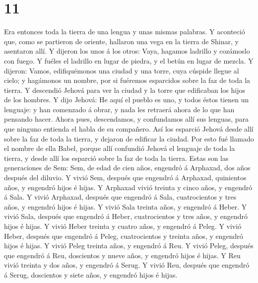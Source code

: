 \hypertarget{section-10}{%
\section{11}\label{section-10}}

 Era entonces toda la tierra de una lengua y unas mismas
palabras.  Y aconteció que, como se partieron de oriente,
hallaron una vega en la tierra de Shinar, y asentaron allí. 
Y dijeron los unos á los otros: Vaya, hagamos ladrillo y cozámoslo con
fuego. Y fuéles el ladrillo en lugar de piedra, y el betún en lugar de
mezcla.  Y dijeron: Vamos, edifiquémonos una ciudad y una
torre, cuya cúspide llegue al cielo; y hagámonos un nombre, por si
fuéremos esparcidos sobre la faz de toda la tierra.  Y
descendió Jehová para ver la ciudad y la torre que edificaban los hijos
de los hombres.  Y dijo Jehová: He aquí el pueblo es uno, y
todos éstos tienen un lenguaje: y han comenzado á obrar, y nada les
retraerá ahora de lo que han pensando hacer.  Ahora pues,
descendamos, y confundamos allí sus lenguas, para que ninguno entienda
el habla de su compañero.  Así los esparció Jehová desde
allí sobre la faz de toda la tierra, y dejaron de edificar la ciudad.
 Por esto fué llamado el nombre de ella Babel, porque allí
confundió Jehová el lenguaje de toda la tierra, y desde allí los
esparció sobre la faz de toda la tierra.  Estas son las
generaciones de Sem: Sem, de edad de cien años, engendró á Arphaxad, dos
años después del diluvio.  Y vivió Sem, después que
engendró á Arphaxad, quinientos años, y engendró hijos é hijas.
 Y Arphaxad vivió treinta y cinco años, y engendró á Sala.
 Y vivió Arphaxad, después que engendró á Sala,
cuatrocientos y tres años, y engendró hijos é hijas.  Y
vivió Sala treinta años, y engendró á Heber.  Y vivió Sala,
después que engendró á Heber, cuatrocientos y tres años, y engendró
hijos é hijas.  Y vivió Heber treinta y cuatro años, y
engendró á Peleg.  Y vivió Heber, después que engendró á
Peleg, cuatrocientos y treinta años, y engendró hijos é hijas.
 Y vivió Peleg treinta años, y engendró á Reu.
 Y vivió Peleg, después que engendró á Reu, doscientos y
nueve años, y engendró hijos é hijas.  Y Reu vivió treinta
y dos años, y engendró á Serug.  Y vivió Reu, después que
engendró á Serug, doscientos y siete años, y engendró hijos é hijas.
